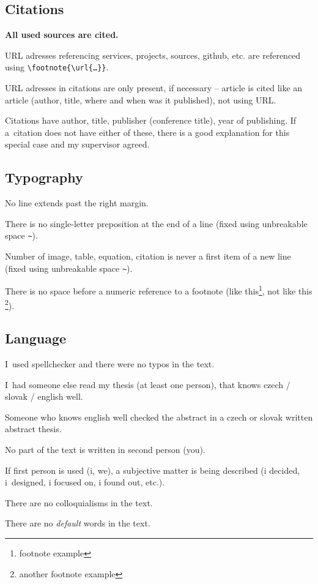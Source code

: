 \subsection*{Citations}
\begin{checklist}
	\item \bf All used sources are cited. \rm
	\item URL adresses referencing services, projects, sources, github, etc. are referenced using \verb|\footnote{\url{…}}|.
    \item URL adresses in citations are only present, if necessary – article is cited like an article (author, title, where and when was it published), not using URL.
    \item Citations have author, title, publisher (conference title), year of publishing. If a~citation does not have either of these, there is a good explanation for this special case and my supervisor agreed.
\end{checklist}

\subsection*{Typography}
\begin{checklist}
	\item No line extends past the right margin.
    \item There is no single-letter preposition at the end of a line (fixed using unbreakable space \verb|~|).
    \item Number of image, table, equation, citation is never a first item of a new line (fixed using unbreakable space \verb|~|).
    \item There is no space before a numeric reference to a footnote (like this\footnote{footnote example}, not like this \footnote{another footnote example}).
\end{checklist}

\subsection*{Language}
\begin{checklist}
	\item I~used spellchecker and there were no typos in the text.
    \item I~had someone else read my thesis (at least one person), that knows czech / slovak / english well.
    \item Someone who knows english well checked the abstract  in a czech or slovak written abstract thesis.
    \item No part of the text is written in second person (you).
    \item If first person is used (i, we), a subjective matter is being described (i decided, i~designed, i focused on, i found out, etc.).
    \item There are no colloquialisms in the text.
    \item There are no {\it default} words in the text.
\end{checklist}


